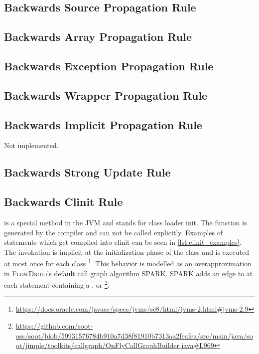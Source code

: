 \documentclass[../draft.tex]{subfiles}
\begin{document}
    \subsection{Backwards Source Propagation Rule}\label{s:sourcerule}

    \subsection{Backwards Array Propagation Rule}

    \subsection{Backwards Exception Propagation Rule}

    \subsection{Backwards Wrapper Propagation Rule}

    \subsection{Backwards Implicit Propagation Rule}
    Not implemented.

    \subsection{Backwards Strong Update Rule}

    \subsection{Backwards Clinit Rule}\label{s:clinitrule}
     is a special method in the JVM and stands for class loader init. The function is generated by the compiler and can not be called explicitly. Examples of statements which get compiled into clinit can be seen in \autoref{lst:clinit_examples}. The invokation is implicit at the initialization phase of the class and is executed at most once for each class \footnote{\url{https://docs.oracle.com/javase/specs/jvms/se8/html/jvms-2.html\#jvms-2.9}}. 
    This behavior is modelled as an overapproximation in \textsc{FlowDroid}'s default call graph algorithm SPARK. SPARK adds an edge to  at each statement containing a ,  or  \footnote{\url{https://github.com/soot-oss/soot/blob/59931576784b910a7d38f81910b7313aa2feafea/src/main/java/soot/jimple/toolkits/callgraph/OnFlyCallGraphBuilder.java\#L969}}.
   
\end{document}
